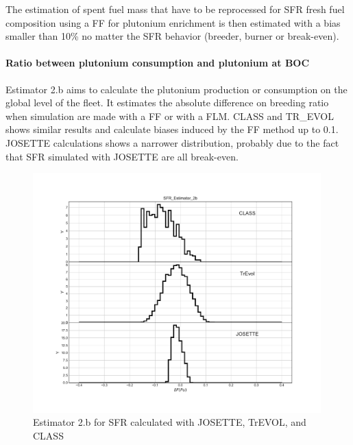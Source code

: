 The estimation of spent fuel mass that have to be reprocessed for SFR fresh fuel
composition using a \gls{FF} for plutonium enrichment is then estimated with a bias
smaller than 10\% no matter the SFR behavior (breeder, burner or break-even).  

\paragraph{Ratio between plutonium consumption and plutonium at \gls{BOC}}

Estimator 2.b aims to calculate the plutonium production or consumption on the
global level of the fleet. It estimates the absolute difference on breeding
ratio when simulation are made with a \gls{FF} or with a \gls{FLM}. CLASS and TR\_EVOL shows
similar results and calculate biases induced by the \gls{FF} method up to 0.1. JOSETTE
calculations shows a narrower distribution, probably due to the fact that SFR
simulated with JOSETTE are all break-even.   

\begin{figure}[h]
	\begin{center}
		\includegraphics[width = 0.99\textwidth]{../../Feature_1/RAW_DATA/FIG/SFR_Estimator_2b.pdf}
		\caption{Estimator 2.b for SFR calculated with JOSETTE, TrEVOL, and CLASS}
		\label{fig:Est2_SFR}
	\end{center}
\end{figure}
